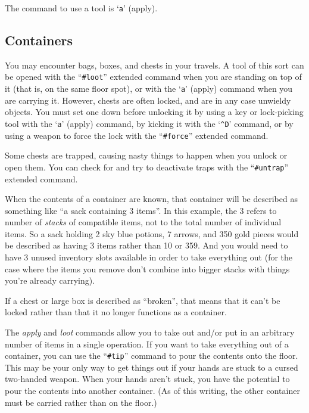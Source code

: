 \documentclass[titlepage]{article}
\begin{document}
The command to use a tool is `\texttt{a}' (apply).

\subsection*{Containers}

You may encounter bags, boxes, and chests in your travels.  A tool of
this sort can be opened with the ``\texttt{\#loot}'' extended command when
you are standing on top of it (that is, on the same floor spot),
or with the `\texttt{a}' (apply) command when you are carrying it.  However,
chests are often locked, and are in any case unwieldy objects.
You must set one down before unlocking it by
using a key or lock-picking tool with the `\texttt{a}' (apply) command,
by kicking it with the `\texttt{\textasciicircum D}' command,
or by using a weapon to force the lock with the ``\texttt{\#force}''
extended command.

Some chests are trapped, causing nasty things to happen when you
unlock or open them.  You can check for and try to deactivate traps
with the ``\texttt{\#untrap}'' extended command.

When the contents of a container are known, that container will be
described as something like ``a sack containing 3 items''.
In this example, the 3 refers to number of \textit{stacks} of compatible
items, not to the total number of individual items.
So a sack holding 2 sky blue potions, 7 arrows, and 350 gold pieces would be
described as having 3 items rather than 10 or 359.
And you would need to have 3 unused inventory slots available in order
to take everything out (for the case where the items you remove don't
combine into bigger stacks with things you're already carrying).

If a chest or large box is described as ``broken'', that means that it
can't be locked rather than that it no longer functions as a container.

The \textit{apply} and \textit{loot} commands allow you to take out and/or
put in an arbitrary number of items in a single operation.
If you want to take everything out of a container, you can use the
``\texttt{\#tip}'' command to pour the contents onto the floor.
This may be your only way to get things out if your hands are stuck
to a cursed two-handed weapon.
When your hands aren't stuck, you have the potential to pour the
contents into another container.
(As of this writing, the other container must be carried rather than on
the floor.)
\end{document}
